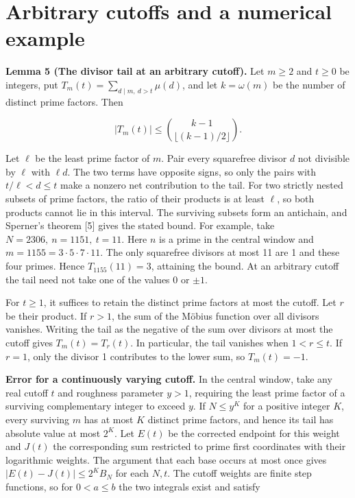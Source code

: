 \documentclass[11pt,a4paper]{article}
\begin{document}
\section{Arbitrary cutoffs and a numerical example}

\textbf{Lemma 5 (The divisor tail at an arbitrary cutoff).} Let $m\ge2$ and $t\ge0$ be integers, put $T_m(t)=\sum_{d\mid m,\ d>t}\mu(d)$, and let $k=\omega(m)$ be the number of distinct prime factors. Then

\[
\left|T_m(t)\right|\le\binom{k-1}{\lfloor(k-1)/2\rfloor}.
\]

Let $\ell$ be the least prime factor of $m$. Pair every squarefree divisor $d$ not divisible by $\ell$ with $\ell d$. The two terms have opposite signs, so only the pairs with $t/\ell<d\le t$ make a nonzero net contribution to the tail. For two strictly nested subsets of prime factors, the ratio of their products is at least $\ell$, so both products cannot lie in this interval. The surviving subsets form an antichain, and Sperner's theorem [5] gives the stated bound. For example, take $N=2306,\ n=1151,\ t=11$. Here $n$ is a prime in the central window and $m=1155=3\cdot5\cdot7\cdot11$. The only squarefree divisors at most 11 are 1 and these four primes. Hence $T_{1155}(11)=3$, attaining the bound. At an arbitrary cutoff the tail need not take one of the values $0$ or $\pm1$.

For $t\ge1$, it suffices to retain the distinct prime factors at most the cutoff. Let $r$ be their product. If $r>1$, the sum of the Möbius function over all divisors vanishes. Writing the tail as the negative of the sum over divisors at most the cutoff gives $T_m(t)=T_r(t)$. In particular, the tail vanishes when $1<r\le t$. If $r=1$, only the divisor 1 contributes to the lower sum, so $T_m(t)=-1$.

\textbf{Error for a continuously varying cutoff.} In the central window, take any real cutoff $t$ and roughness parameter $y>1$, requiring the least prime factor of a surviving complementary integer to exceed $y$. If $N\le y^K$ for a positive integer $K$, every surviving $m$ has at most $K$ distinct prime factors, and hence its tail has absolute value at most $2^K$. Let $E(t)$ be the corrected endpoint for this weight and $J(t)$ the corresponding sum restricted to prime first coordinates with their logarithmic weights. The argument that each base occurs at most once gives $|E(t)-J(t)|\le2^K B_N$ for each $N,t$. The cutoff weights are finite step functions, so for $0<a\le b$ the two integrals exist and satisfy
\end{document}
